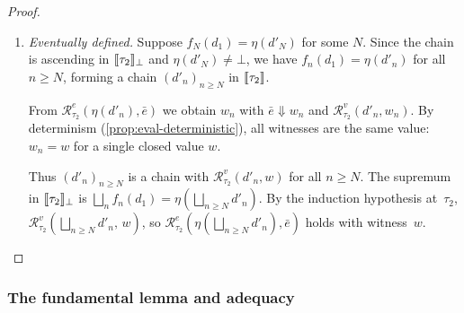 \begin{proof}
\begin{enumerate}
  \item \emph{Eventually defined.}\;
    Suppose $f_N(d_1) = \eta(d'_N)$ for some $N$.  Since the chain
    is ascending in $\llbracket \tau_2 \rrbracket_\bot$ and $\eta(d'_N) \neq \bot$,
    we have $f_n(d_1) = \eta(d'_n)$ for all $n \geq N$, forming a
    chain $(d'_n)_{n \geq N}$ in $\llbracket \tau_2 \rrbracket$.

    From $\mathcal{R}^e_{\tau_2}(\eta(d'_n), \bar{e})$
    we obtain $w_n$ with $\bar{e} \Downarrow w_n$ and
    $\mathcal{R}^v_{\tau_2}(d'_n, w_n)$.  By determinism
    (\cref{prop:eval-deterministic}), all witnesses are the same
    value: $w_n = w$ for a single closed value $w$.

    Thus $(d'_n)_{n \geq N}$ is a chain with
    $\mathcal{R}^v_{\tau_2}(d'_n, w)$ for all $n \geq N$.  The
    supremum in $\llbracket \tau_2 \rrbracket_\bot$ is
    $\bigsqcup_n f_n(d_1) = \eta(\bigsqcup_{n \geq N} d'_n)$.
    By the induction hypothesis at~$\tau_2$,
    $\mathcal{R}^v_{\tau_2}(\bigsqcup_{n \geq N} d'_n,\, w)$, so
    $\mathcal{R}^e_{\tau_2}(\eta(\bigsqcup_{n \geq N} d'_n),
    \bar{e})$ holds with witness~$w$.
\end{enumerate}
\vspace{-0.5em}
\end{proof}

\subsubsection*{The fundamental lemma and adequacy}

